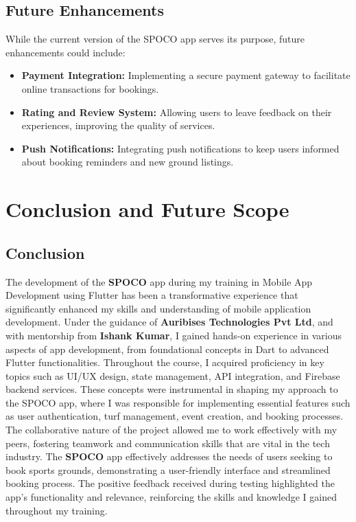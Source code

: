 \documentclass[12pt,a4paper]{report}
\begin{document}
\section{Future Enhancements}
While the current version of the SPOCO app serves its purpose, future enhancements could include:

\begin{itemize}
    \item \textbf{Payment Integration:} Implementing a secure payment gateway to facilitate online transactions for bookings.
    \item \textbf{Rating and Review System:} Allowing users to leave feedback on their experiences, improving the quality of services.
    \item \textbf{Push Notifications:} Integrating push notifications to keep users informed about booking reminders and new ground listings.
\end{itemize}

\chapter{Conclusion and Future Scope}

\section{Conclusion}
The development of the \textbf{SPOCO} app during my training in Mobile App Development using Flutter has been a transformative experience that significantly enhanced my skills and understanding of mobile application development. Under the guidance of \textbf{Auribises Technologies Pvt Ltd}, and with mentorship from \textbf{Ishank Kumar}, I gained hands-on experience in various aspects of app development, from foundational concepts in Dart to advanced Flutter functionalities.
Throughout the course, I acquired proficiency in key topics such as UI/UX design, state management, API integration, and Firebase backend services. These concepts were instrumental in shaping my approach to the SPOCO app, where I was responsible for implementing essential features such as user authentication, turf management, event creation, and booking processes. The collaborative nature of the project allowed me to work effectively with my peers, fostering teamwork and communication skills that are vital in the tech industry.
The \textbf{SPOCO} app effectively addresses the needs of users seeking to book sports grounds, demonstrating a user-friendly interface and streamlined booking process. The positive feedback received during testing highlighted the app's functionality and relevance, reinforcing the skills and knowledge I gained throughout my training.
\end{document}
